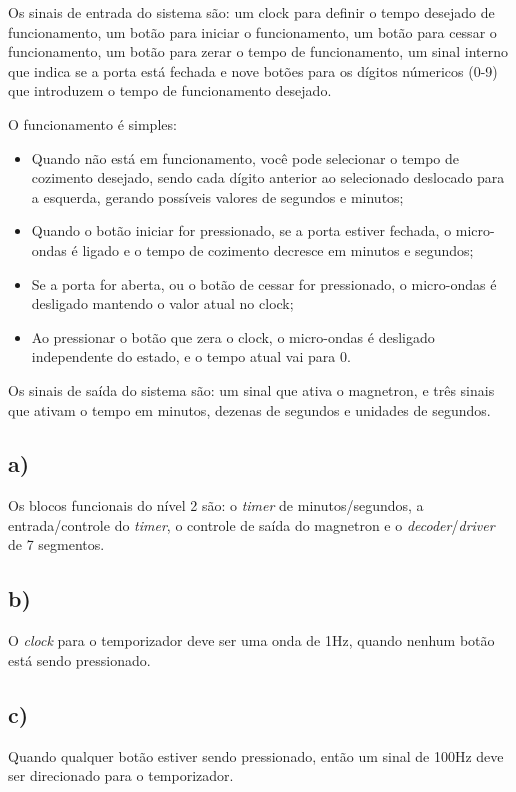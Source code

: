 \documentclass[12pt]{article}
\begin{document}
Os sinais de entrada do sistema são: um clock para definir o tempo desejado de  funcionamento, um botão para iniciar o funcionamento, um botão para cessar o funcionamento, um botão para zerar o tempo de funcionamento, um sinal interno que indica se a porta está fechada e nove botões para os dígitos númericos (0-9) que introduzem o tempo de funcionamento desejado.


O funcionamento é simples:

\begin{center}
	\begin{itemize}
		\item Quando não está em funcionamento, você pode selecionar o tempo de cozimento desejado, sendo cada dígito anterior ao selecionado deslocado para a esquerda, gerando possíveis valores de segundos e minutos;
		\item Quando o botão iniciar for pressionado, se a porta estiver fechada, o micro-ondas é ligado e o tempo de cozimento decresce em minutos e segundos;
		\item Se a porta for aberta, ou o botão de cessar for pressionado, o micro-ondas é desligado mantendo o valor atual no clock;
		\item Ao pressionar o botão que zera o clock, o micro-ondas é desligado independente do estado, e o tempo atual vai para 0.
	\end{itemize}
\end{center}

Os sinais de saída do sistema são: um sinal que ativa o magnetron, e três sinais que ativam o tempo em minutos, dezenas de segundos e unidades de segundos.


\subsection*{a)} Os blocos funcionais do nível 2 são: o \textit{timer} de minutos/segundos, a entrada/controle do \textit{timer}, o controle de saída do magnetron e o \textit{decoder}/\textit{driver} de 7 segmentos.

\subsection*{b)} O \textit{clock} para o temporizador deve ser uma onda de 1Hz, quando nenhum botão está sendo pressionado.

\subsection*{c)} Quando qualquer botão estiver sendo pressionado, então um sinal de 100Hz deve ser direcionado para o temporizador.
\end{document}
